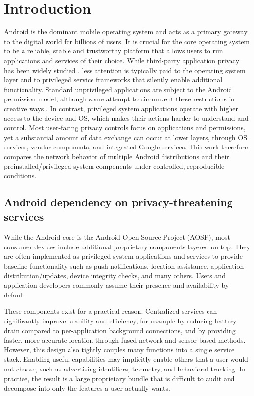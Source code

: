 \documentclass[runningheads]{llncs}
\begin{document}
\section{Introduction}
Android is the dominant mobile operating system and acts as a primary gateway to the digital world for billions of users. It is crucial for the core operating system to be a reliable, stable and trustworthy platform that allows users to run applications and services of their choice. While third-party application privacy has been widely studied \cite{appDataCollection1,appDataCollection2,appDataCollection3,appDataCollection4}, less attention is typically paid to the operating system layer and to privileged service frameworks that silently enable additional functionality. Standard unprivileged applications are subject to the Android permission model, although some attempt to circumvent these restrictions in creative ways \cite{appDataCollection5Circumvention,appDataCollection6Circumvention}. In contrast, privileged system applications operate with higher access to the device and OS, which makes their actions harder to understand and control. Most user-facing privacy controls focus on applications and permissions, yet a substantial amount of data exchange can occur at lower layers, through OS services, vendor components, and integrated Google services. This work therefore compares the network behavior of multiple Android distributions and their preinstalled/privileged system components under controlled, reproducible conditions.

\subsection{Android dependency on privacy-threatening services}
While the Android core is the Android Open Source Project (AOSP), most consumer devices include additional proprietary components layered on top. They are often implemented as privileged system applications and services to provide baseline functionality such as push notifications, location assistance, application distribution/updates, device integrity checks, and many others. Users and application developers commonly assume their presence and availability by default. 

These components exist for a practical reason. Centralized services can significantly improve usability and efficiency, for example by reducing battery drain compared to per‑application background connections, and by providing faster, more accurate location through fused network and sensor-based methods. However, this design also tightly couples many functions into a single service stack. Enabling useful capabilities may implicitly enable others that a user would not choose, such as advertising identifiers, telemetry, and behavioral tracking. In practice, the result is a large proprietary bundle that is difficult to audit and decompose into only the features a user actually wants.
\end{document}
